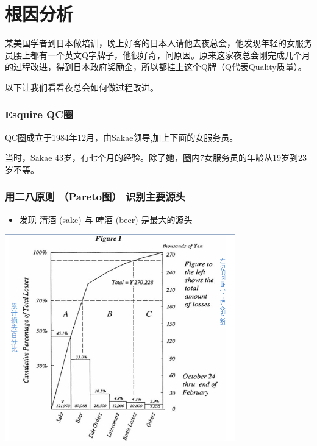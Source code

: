 \chapter{根因分析} %

某美国学者到日本做培训，晚上好客的日本人请他去夜总会，他发现年轻的女服务员腰上都有一个英文Q字牌子，他很好奇，问原因。原来这家夜总会刚完成几个月的过程改进，得到日本政府奖励金，所以都挂上这个Q牌（Q代表Quality质量）。

以下让我们看看夜总会如何做过程改进。




\hypertarget{esquire-qcux5708}{%
\subsection{Esquire QC圈}\label{esquire-qcux5708}}

QC圈成立于1984年12月，由Sakae领导,加上下面的女服务员。

当时，Sakae
43岁，有七个月的经验。除了她，圈内7女服务员的年龄从19岁到23岁不等。

\hypertarget{ux7528ux4e8cux516bux539fux5219-paretoux56fe-ux8bc6ux522bux4e3bux8981ux6e90ux5934}{%
\subsection{用二八原则 （Pareto图）
识别主要源头}\label{ux7528ux4e8cux516bux539fux5219-paretoux56fe-ux8bc6ux522bux4e3bux8981ux6e90ux5934}}

\begin{itemize}
\tightlist
\item
  发现 清酒 (sake) 与 啤酒 (beer) 是最大的源头
\end{itemize}


\includegraphics[width=10cm]{club55.png}


